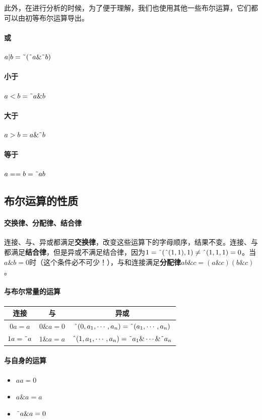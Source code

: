 此外，在进行分析的时候，为了便于理解，我们也使用其他一些布尔运算，它们都可以由初等布尔运算导出。
\paragraph*{或}$a|b=\textrm{\~{}}(\textrm{\~{}}a\&\textrm{\~{}}b)$
\paragraph*{小于}$a<b=\textrm{\~{}}a\&b$
\paragraph*{大于}$a>b=a\&\textrm{\~{}}b$
\paragraph*{等于}$a==b=\textrm{\~{}}ab$

\subsection{布尔运算的性质}\label{sec9317}

\paragraph*{交换律、分配律、结合律}

连接、与、异或都满足\textbf{交换律}，改变这些运算下的字母顺序，结果不变。连接、与都满足\textbf{结合律}，但是异或不满足结合律，因为$1=\textrm{\^{}}(\textrm{\^{}}(1,1),1)\ne \textrm{\^{}}(1,1,1)=0$。当$a\&b=0$时（这个条件必不可少！），与和连接满足\textbf{分配律}$ab\&c=(a\&c)(b\&c)$。

\paragraph*{与布尔常量的运算}
\begin{flushleft}
\begin{tabular}{|c|c|c|}
\hline
连接&与&异或\\\hline
$0a=a$&$0\&a=0$&$\textrm{\^{}}(0,a_1,\cdots,a_n)=\textrm{\^{}}(a_1,\cdots,a_n)$\\\hline
$1a=\textrm{\~{}} a$&$1\&a=a$&$\textrm{\^{}}(1,a_1,\cdots,a_n)=\textrm{\~{}} a_1\&\cdots\&\textrm{\~{}} a_n$\\\hline
\end{tabular}
\end{flushleft}

\paragraph*{与自身的运算}
\begin{itemize}
\item $aa=0$
\item $a\& a=a$
\item $\textrm{\~{}} a\& a=0$
\end{itemize}

